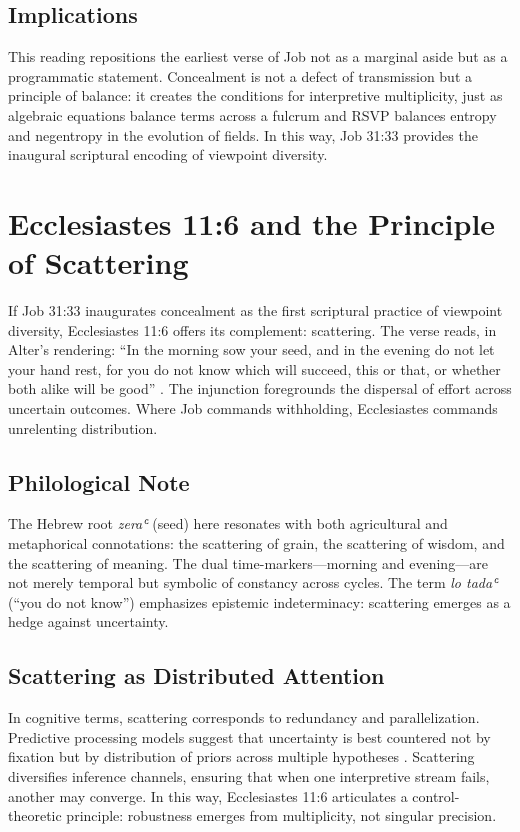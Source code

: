 \documentclass[a4paper,11pt,openany]{book}
\begin{document}
\section{Implications}
This reading repositions the earliest verse of Job not as a marginal aside but as a programmatic statement. Concealment is not a defect of transmission but a principle of balance: it creates the conditions for interpretive multiplicity, just as algebraic equations balance terms across a fulcrum and RSVP balances entropy and negentropy in the evolution of fields. In this way, Job 31:33 provides the inaugural scriptural encoding of viewpoint diversity.

\chapter{Ecclesiastes 11:6 and the Principle of Scattering}

If Job 31:33 inaugurates concealment as the first scriptural practice of viewpoint diversity, Ecclesiastes 11:6 offers its complement: scattering. The verse reads, in Alter’s rendering: ``In the morning sow your seed, and in the evening do not let your hand rest, for you do not know which will succeed, this or that, or whether both alike will be good'' \citep{alter2010wisdom}. The injunction foregrounds the dispersal of effort across uncertain outcomes. Where Job commands withholding, Ecclesiastes commands unrelenting distribution.

\section{Philological Note}
The Hebrew root \textit{zeraʿ} (seed) here resonates with both agricultural and metaphorical connotations: the scattering of grain, the scattering of wisdom, and the scattering of meaning. The dual time-markers---morning and evening---are not merely temporal but symbolic of constancy across cycles. The term \textit{lo tadaʿ} (``you do not know'') emphasizes epistemic indeterminacy: scattering emerges as a hedge against uncertainty.

\section{Scattering as Distributed Attention}
In cognitive terms, scattering corresponds to redundancy and parallelization. Predictive processing models suggest that uncertainty is best countered not by fixation but by distribution of priors across multiple hypotheses \citep{friston2010freeenergy}. Scattering diversifies inference channels, ensuring that when one interpretive stream fails, another may converge. In this way, Ecclesiastes 11:6 articulates a control-theoretic principle: robustness emerges from multiplicity, not singular precision.
\end{document}
